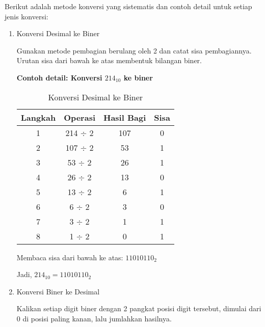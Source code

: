 \documentclass[../main.tex]{subfiles}
\begin{document}
            Berikut adalah metode konversi yang sistematis dan contoh detail untuk setiap jenis konversi:

            \begin{enumerate}
                \item{Konversi Desimal ke Biner}

                    Gunakan metode pembagian berulang oleh 2 dan catat sisa pembagiannya. Urutan sisa dari bawah ke atas membentuk bilangan biner.

                    \textbf{Contoh detail: Konversi \(214_{10}\) ke biner}

                    \begin{table}[H]
                        \centering
                        \caption{Konversi Desimal ke Biner}
                        \begin{tabular}{|c|c|c|c|}
                            \hline
                            \textbf{Langkah} & \textbf{Operasi} & \textbf{Hasil Bagi} & \textbf{Sisa} \\
                            \hline
                            1 & 214 $\div$ 2 & 107 & 0 \\
                            2 & 107 $\div$ 2 & 53 & 1 \\
                            3 & 53 $\div$ 2 & 26 & 1 \\
                            4 & 26 $\div$ 2 & 13 & 0 \\
                            5 & 13 $\div$ 2 & 6 & 1 \\
                            6 & 6 $\div$ 2 & 3 & 0 \\
                            7 & 3 $\div$ 2 & 1 & 1 \\
                            8 & 1 $\div$ 2 & 0 & 1 \\
                            \hline
                        \end{tabular}
                        \label{tab:decimal-to-binary}
                    \end{table}

                    Membaca sisa dari bawah ke atas: \(11010110_2\)

                    Jadi, \(214_{10} = 11010110_2\)

                \item{Konversi Biner ke Desimal}

                    Kalikan setiap digit biner dengan 2 pangkat posisi digit tersebut, dimulai dari 0 di posisi paling kanan, lalu jumlahkan hasilnya.


\end{enumerate}
\end{document}
